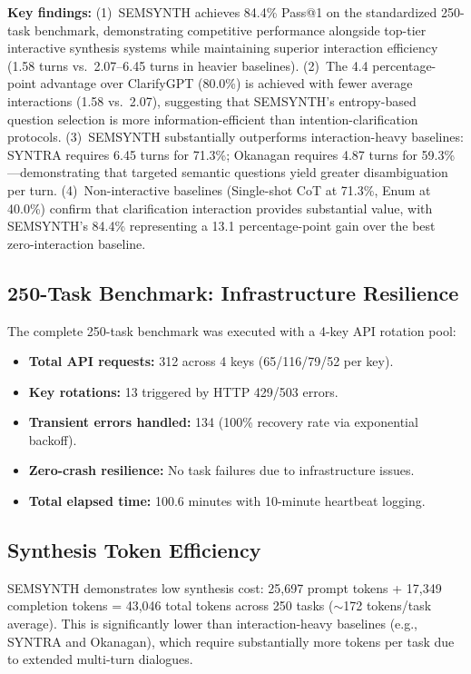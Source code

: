 \documentclass[10pt,conference]{IEEEtran}
\begin{document}
\textbf{Key findings:}
(1)~SEMSYNTH achieves 84.4\% Pass@1 on the standardized 250-task benchmark, demonstrating competitive performance alongside top-tier interactive synthesis systems while maintaining superior interaction efficiency (1.58 turns vs.~2.07--6.45 turns in heavier baselines).
(2)~The 4.4 percentage-point advantage over ClarifyGPT (80.0\%) is achieved with fewer average interactions (1.58 vs.~2.07), suggesting that SEMSYNTH's entropy-based question selection is more information-efficient than intention-clarification protocols.
(3)~SEMSYNTH substantially outperforms interaction-heavy baselines: SYNTRA requires 6.45 turns for 71.3\%; Okanagan requires 4.87 turns for 59.3\%---demonstrating that targeted semantic questions yield greater disambiguation per turn.
(4)~Non-interactive baselines (Single-shot CoT at 71.3\%, Enum at 40.0\%) confirm that clarification interaction provides substantial value, with SEMSYNTH's 84.4\% representing a 13.1 percentage-point gain over the best zero-interaction baseline.

\subsection{250-Task Benchmark: Infrastructure Resilience}
The complete 250-task benchmark was executed with a 4-key API rotation pool:
\begin{itemize}
  \item \textbf{Total API requests:} 312 across 4 keys (65/116/79/52 per key).
  \item \textbf{Key rotations:} 13 triggered by HTTP 429/503 errors.
  \item \textbf{Transient errors handled:} 134 (100\% recovery rate via exponential backoff).
  \item \textbf{Zero-crash resilience:} No task failures due to infrastructure issues.
  \item \textbf{Total elapsed time:} 100.6 minutes with 10-minute heartbeat logging.
\end{itemize}

\subsection{Synthesis Token Efficiency}
SEMSYNTH demonstrates low synthesis cost: 25,697 prompt tokens + 17,349 completion tokens = 43,046 total tokens across 250 tasks ($\sim$172 tokens/task average). This is significantly lower than interaction-heavy baselines (e.g., SYNTRA and Okanagan), which require substantially more tokens per task due to extended multi-turn dialogues.
\end{document}
